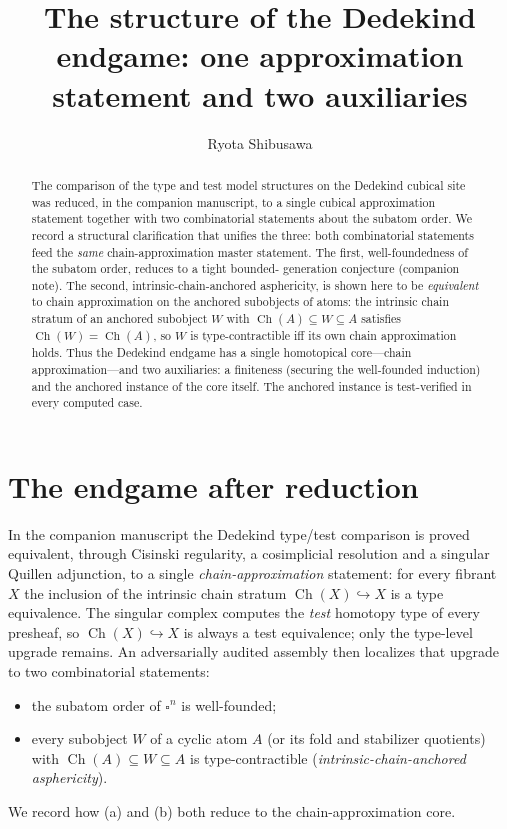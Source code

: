 \documentclass[11pt]{amsart}
\title[The structure of the Dedekind endgame]
{The structure of the Dedekind endgame: one approximation statement and
 two auxiliaries}
\author{Ryota Shibusawa}
\theoremstyle{plain}
\theoremstyle{definition}
\newcommand{\Ch}{\operatorname{Ch}}
\newcommand{\cube}{\square}
\begin{document}
\begin{abstract}
  The comparison of the type and test model structures on the Dedekind
  cubical site was reduced, in the companion manuscript, to a single
  cubical approximation statement together with two combinatorial
  statements about the subatom order.  We record a structural
  clarification that unifies the three: both combinatorial statements
  feed the \emph{same} chain-approximation master statement.  The first,
  well-foundedness of the subatom order, reduces to a tight bounded-%
  generation conjecture (companion note).  The second,
  intrinsic-chain-anchored asphericity, is shown here to be
  \emph{equivalent} to chain approximation on the anchored subobjects of
  atoms: the intrinsic chain stratum of an anchored subobject $W$ with
  $\Ch(A)\subseteq W\subseteq A$ satisfies $\Ch(W)=\Ch(A)$, so $W$ is
  type-contractible iff its own chain approximation holds.  Thus the
  Dedekind endgame has a single homotopical core---chain
  approximation---and two auxiliaries: a finiteness (securing the
  well-founded induction) and the anchored instance of the core itself.
  The anchored instance is test-verified in every computed case.
\end{abstract}

\maketitle

\section{The endgame after reduction}

In the companion manuscript the Dedekind type/test comparison is proved
equivalent, through Cisinski regularity, a cosimplicial resolution and a
singular Quillen adjunction, to a single \emph{chain-approximation}
statement: for every fibrant $X$ the inclusion of the intrinsic chain
stratum $\Ch(X)\hookrightarrow X$ is a type equivalence.  The singular
complex computes the \emph{test} homotopy type of every presheaf, so
$\Ch(X)\hookrightarrow X$ is always a test equivalence; only the
type-level upgrade remains.  An adversarially audited assembly then
localizes that upgrade to two combinatorial statements:
\begin{itemize}
\item[(a)] the subatom order of $\cube^n$ is well-founded;
\item[(b)] every subobject $W$ of a cyclic atom $A$ (or its fold and
  stabilizer quotients) with $\Ch(A)\subseteq W\subseteq A$ is
  type-contractible (\emph{intrinsic-chain-anchored asphericity}).
\end{itemize}
We record how (a) and (b) both reduce to the chain-approximation core.
\end{document}
